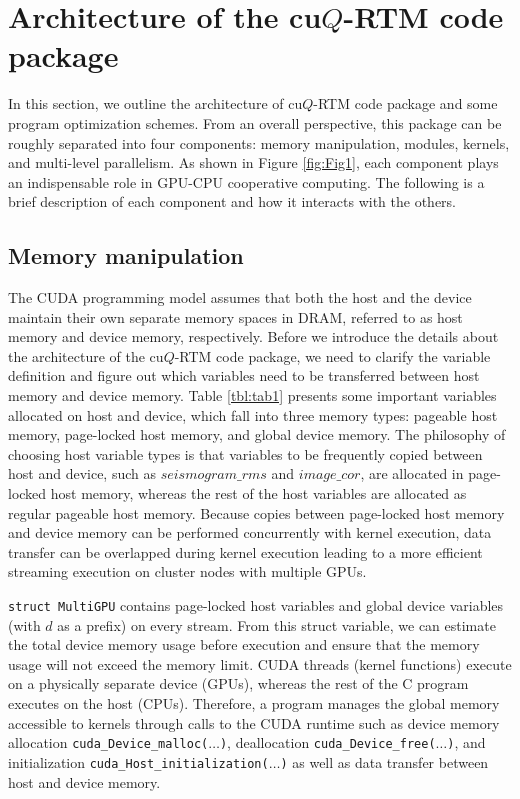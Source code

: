 \section{Architecture of the cu$Q$-RTM code package}

In this section, we outline the architecture of cu$Q$-RTM code package and some program optimization schemes. From an overall perspective, this package can be roughly separated into four components: memory manipulation, modules, kernels, and multi-level parallelism. As shown in Figure \ref{fig:Fig1}, each component plays an indispensable role in GPU-CPU cooperative computing. The following is a brief description of each component and how it interacts with the others.

\subsection{Memory manipulation}

The CUDA programming model assumes that both the host and the device maintain their own separate memory spaces in DRAM, referred to as host memory and device memory, respectively. Before we introduce the details about the architecture of the cu$Q$-RTM code package, we need to clarify the variable definition and figure out which variables need to be transferred between host memory and device memory. Table \ref{tbl:tab1} presents some important variables allocated on host and device, which fall into three memory types: pageable host memory, page-locked host memory, and global device memory. The philosophy of choosing host variable types is that variables to be frequently copied between host and device, such as $seismogram\_rms$ and $image\_cor$, are allocated in page-locked host memory, whereas the rest of the host variables are allocated as regular pageable host memory. Because copies between page-locked host memory and device memory can be performed concurrently with kernel execution, data transfer can be overlapped during kernel execution leading to a more efficient streaming execution on cluster nodes with multiple GPUs. 

\texttt{struct MultiGPU} contains page-locked host variables and global device variables (with $d$ as a prefix) on every stream. From this struct variable, we can estimate the total device memory usage before execution and ensure that the memory usage will not exceed the memory limit. CUDA threads (kernel functions) execute on a physically separate device (GPUs), whereas the rest of the C program executes on the host (CPUs). Therefore, a program manages the global memory accessible to kernels through calls to the CUDA runtime such as device memory allocation \texttt{cuda\_Device\_malloc($\ldots$)}, deallocation \texttt{cuda\_Device\_free($\ldots$)}, and initialization \texttt{cuda\_Host\_initialization($\ldots$)} as well as data transfer between host and device memory. 


